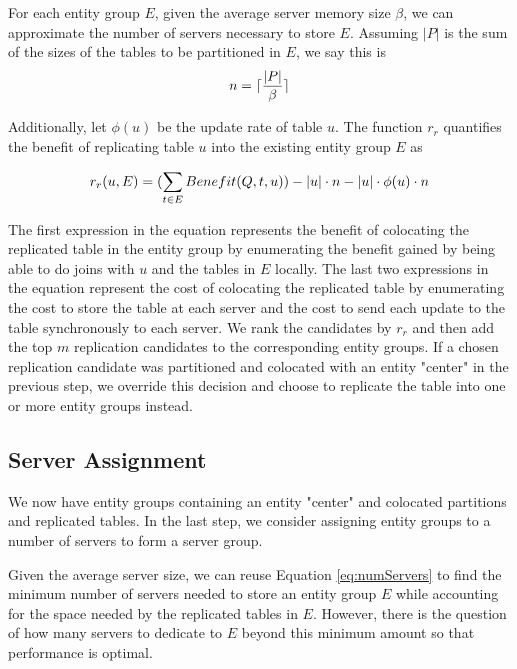 For each entity group $E$, given the average server memory size $\beta$, we can approximate the number of servers necessary to store $E$. Assuming $|P|$ is the sum of the sizes of the tables to be partitioned in $E$, we say this is 
\vspace*{-4pt}
\begin{equation}
\label{eq:numServers}
n = \lceil \frac{|P|}{\beta} \rceil
\vspace*{-4pt}
\end{equation}

Additionally, let $\phi(u)$ be the update rate of table $u$. The function $r_r$ quantifies the benefit of replicating table $u$ into the existing entity group $E$ as

\begin{equation}
\vspace*{-6pt}
r_r(u, E) = (\sum_{t \in E} Benefit(Q,t,u)) - |u| \cdot n - |u| \cdot \phi(u) \cdot n
\vspace*{-2pt}
\end{equation}

The first expression in the equation represents the benefit of colocating the replicated table in the entity group by enumerating the benefit gained by being able to do joins with $u$ and the tables in $E$ locally. The last two expressions in the equation represent the cost of colocating the replicated table by enumerating the cost to store the table at each server and the cost to send each update to the table synchronously to each server.  We rank the candidates by $r_r$ and then add the top $m$ replication candidates to the corresponding entity groups.  If a chosen replication candidate was partitioned and colocated with an entity "center" in the previous step, we override this decision and choose to replicate the table into one or more entity groups instead.

\subsection{Server Assignment}
We now have entity groups containing an entity "center" and colocated partitions and replicated tables. In the last step, we consider assigning entity groups to a number of servers to form a server group.

Given the average server size, we can reuse Equation \ref{eq:numServers} to find the minimum number of servers needed to store an entity group $E$ while accounting for the space needed by the replicated tables in $E$. However, there is the question of how many servers to dedicate to $E$ beyond this minimum amount so that performance is optimal.

